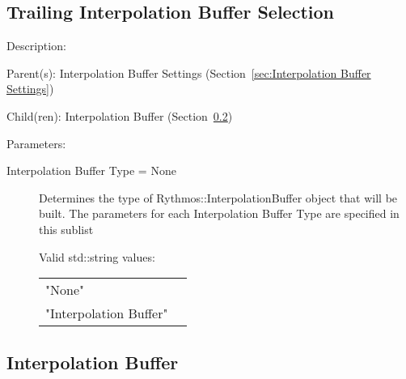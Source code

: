 \subsection{Trailing Interpolation Buffer Selection}
\label{sec:Trailing Interpolation Buffer Selection}

\begin{list}{}
  {\setlength{\leftmargin}{1.0in}
   \setlength{\labelwidth}{0.75in}
   \setlength{\labelsep}{0.125in}}
  \item[Description:]
  \item[Parent(s):]
    Interpolation Buffer Settings (Section~\ref{sec:Interpolation Buffer Settings})
  \item[Child(ren):]
    Interpolation Buffer (Section~\ref{sec:Interpolation Buffer})
  \item[Parameters:]
    \begin{description}
      \item[Interpolation Buffer Type = None] 
Determines the type of Rythmos::InterpolationBuffer object that will be built.
The parameters for each Interpolation Buffer Type are specified in this sublist

  Valid std::string values:

      \begin{tabular}{lp{}}
      "None" & \\ 
      "Interpolation Buffer" & \\ 
      \end{tabular}
\end{description}

\end{list}

\subsection{Interpolation Buffer}
\label{sec:Interpolation Buffer}

